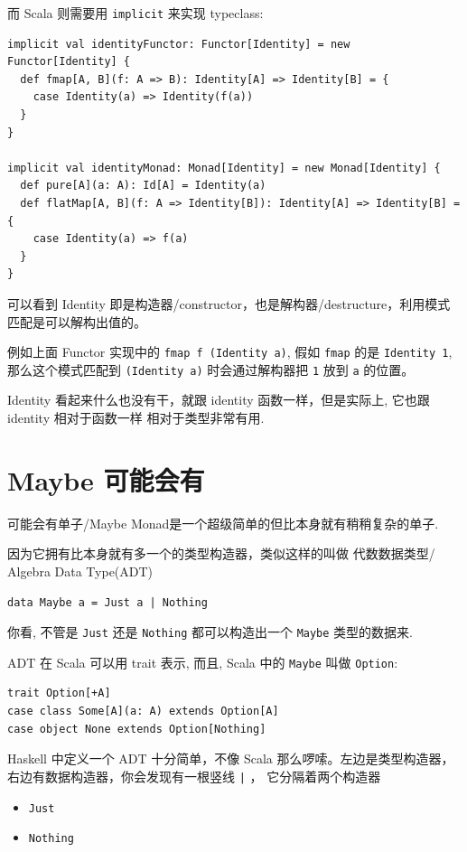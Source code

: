 \documentclass[11pt]{tufte-book}
\begin{document}
而 Scala 则需要用 \texttt{implicit} 来实现 typeclass:

\begin{verbatim}
implicit val identityFunctor: Functor[Identity] = new Functor[Identity] {
  def fmap[A, B](f: A => B): Identity[A] => Identity[B] = {
    case Identity(a) => Identity(f(a))
  }
}

implicit val identityMonad: Monad[Identity] = new Monad[Identity] {
  def pure[A](a: A): Id[A] = Identity(a)
  def flatMap[A, B](f: A => Identity[B]): Identity[A] => Identity[B] = {
    case Identity(a) => f(a)
  }
}
\end{verbatim}

可以看到 Identity 即是构造器/constructor，也是解构器/destructure，利用模式匹配是可以解构出值的。

例如上面 Functor 实现中的 \texttt{fmap f (Identity a)}, 假如 \texttt{fmap} 的是 \texttt{Identity 1},
那么这个模式匹配到 \texttt{(Identity a)} 时会通过解构器把 \texttt{1} 放到 \texttt{a} 的位置。

Identity 看起来什么也没有干，就跟 identity 函数一样，但是实际上, 它也跟 identity 相对于函数一样
相对于类型非常有用.

\chapter{Maybe 可能会有}
\label{sec:orgb9eb3c2}
可能会有单子/Maybe Monad是一个超级简单的但比本身就有稍稍复杂的单子.

因为它拥有比本身就有多一个的类型构造器，类似这样的叫做 代数数据类型/ Algebra Data Type(ADT)

\begin{verbatim}
data Maybe a = Just a | Nothing
\end{verbatim}

你看, 不管是 \texttt{Just} 还是 \texttt{Nothing} 都可以构造出一个 \texttt{Maybe} 类型的数据来.

ADT 在 Scala 可以用 trait 表示, 而且, Scala 中的 \texttt{Maybe} 叫做 \texttt{Option}:

\begin{verbatim}
trait Option[+A]
case class Some[A](a: A) extends Option[A]
case object None extends Option[Nothing]
\end{verbatim}

Haskell 中定义一个 ADT 十分简单，不像 Scala 那么啰嗦。左边是类型构造器，右边有数据构造器，你会发现有一根竖线 \texttt{|} ， 它分隔着两个构造器
\begin{itemize}
\item \texttt{Just}
\item \texttt{Nothing}
\end{itemize}
\end{document}
